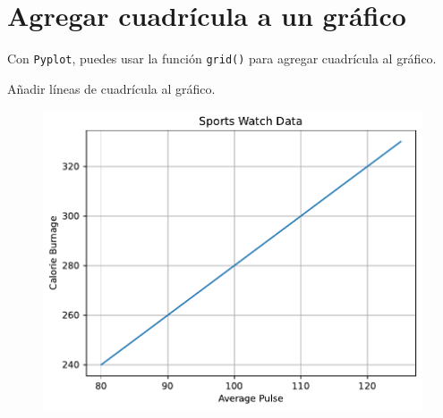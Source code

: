 \section{Agregar cuadrícula a un gráfico}

Con \texttt{Pyplot}, puedes usar la función \texttt{grid()} para agregar
cuadrícula al gráfico.

\begin{code} Añadir líneas de cuadrícula al gráfico.

\begin{Shaded}
\begin{Highlighting}[]

\OperatorTok{=}\NormalTok{ np.array([}\NormalTok{, }\NormalTok{, }\NormalTok{, }\NormalTok{, }\NormalTok{, }\NormalTok{, }\NormalTok{, }\NormalTok{, }\NormalTok{, }\NormalTok{])}
\OperatorTok{=}\NormalTok{ np.array([}\NormalTok{, }\NormalTok{, }\NormalTok{, }\NormalTok{, }\NormalTok{, }\NormalTok{, }\NormalTok{, }\NormalTok{, }\NormalTok{, }\NormalTok{])}

\NormalTok{)}
\NormalTok{)}
\NormalTok{)}

\end{Highlighting}
\end{Shaded}

\begin{figure}
  \centering
  \includegraphics[scale=0.6]{img/grafica1027.pdf}
\end{figure}

\end{code}


